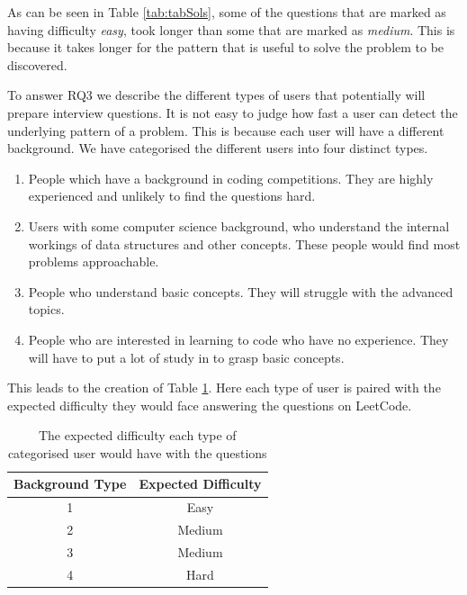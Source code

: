 \documentclass[conference]{IEEEtran}
\begin{document}
\par As can be seen in Table \ref{tab:tabSols}, some of the questions that are marked as having difficulty \textit{easy}, took longer than some that are marked as \textit{medium}. This is because it takes longer for the pattern that is useful to solve the problem to be discovered.
\par To answer RQ3 we describe the different types of users that potentially will prepare interview questions. It is not easy to judge how fast a user can detect the underlying pattern of a problem. This is because each user will have a different background. We have categorised the different users into four distinct types. 
\begin{enumerate}
\item{People which have a background in coding competitions. They are highly experienced and unlikely to find the questions hard.}
\item{Users with some computer science background, who understand the internal workings of data structures and other concepts. These people would find most problems approachable.}
\item{People who understand basic concepts. They will struggle with the advanced topics.}
\item{People who are interested in learning to code who have no experience. They will have to put a lot of study in to grasp basic concepts.}
\end{enumerate}
This leads to the creation of Table \ref{tab:difficulty}. Here each type of user is paired with the expected difficulty they would face answering the questions on LeetCode. 

\begin{table}[H]
\centering
	\begin{tabular}{| c | c |} \hline
		  {\bf Background Type} &{\bf Expected Difficulty} \\ \hline
		1 & Easy \\ \hline
		2 & Medium \\ \hline
		3 & Medium  \\ \hline
		4 & Hard  \\ \hline
	\end{tabular}
	\caption{The expected difficulty each type of categorised user would have with the questions}
	\label{tab:difficulty}
\end{table}
\end{document}
